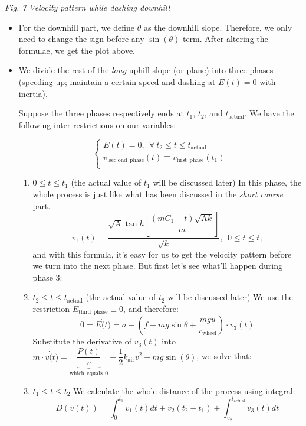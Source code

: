 \documentclass{article}
\begin{document}
\begin{itemize}
\begin{center}
						\small \textit{Fig. 7 Velocity pattern while dashing downhill}
					\end{center}

					\begin{itemize}
						\item For the downhill part, we define \(\theta\) as the downhill slope. Therefore, we only need to change the sign before any \(\sin\left(\theta\right)\) term. After altering the formulae, we get the plot above.
						\item We divide the rest of the \textit{long} uphill slope (or plane) into three phases (speeding up; maintain a certain speed and dashing at \(E(t)=0\) with inertia).

							Suppose the three phases respectively ends at \(t_1\), \(t_2\), and \(t_{\mathrm{actual}}\). We have the following inter-restrictions on our variables:

							$$
							\begin{cases}
								E\left( t \right) =0,\:\:\forall \:t_2\le t\le t_{\mathrm{actual}}\\
								v_{\sec\mathrm{ond}\:\:\mathrm{phase}}\left( t \right) \equiv v_{\mathrm{first}\:\:\mathrm{phase}}\left( t_1 \right)\\
							\end{cases}
							$$
							\begin{enumerate}
								\item \(0\leq t\leq t_1\) (the actual value of \(t_1\) will be discussed later)
									In this phase, the whole process is just like what has been discussed in the \textit{short course} part.
									\[v_1(t)=\dfrac{\sqrt{\mathrm{A}} \tan  h \left[\dfrac{\left(m C _1+t\right)\sqrt{\mathrm{A}k}}{m}\right]}{\sqrt{ k }},\:\:0\leq t\leq t_1\]
									and with this formula, it's easy for us to get the velocity pattern before we turn into the next phase. But first let's see what'll happen during phase 3:
								\item \(t_2\leq t\leq t_{\mathrm{actual}}\) (the actual value of \(t_2\) will be discussed later)
									We use the restriction \(E_{\mathrm{third\:\:phase}}\equiv 0\), and therefore:
									\[0=E \dot(t)=\sigma-\left(f+mg\sin\theta+\dfrac{mgu}{r_{\mathrm{wheel}}}\right)\cdot v_3(t)\]
									Substitute the derivative of \(v_3(t)\) into \(m \cdot v\dot(t)=\underset{\mathrm{which\:\:equals\:\:}0}{\underbrace{\dfrac{P (t)}{v}}}-\dfrac{1}{2} k_{\mathrm{air}} v^2-mg\sin\left(\theta\right)\), we solve that:

								\item \(t_1\leq t\leq t_2\)
									We calculate the whole distance of the process using integral:
									\[D(v(t))=\int_0^{t_1}v_1(t)dt+v_2(t_2-t_1)+\int_{v_2}^{t_{\mathrm{actual}}}v_3(t)dt\]

							\end{enumerate}
					\end{itemize}

			\end{itemize}
\end{document}
